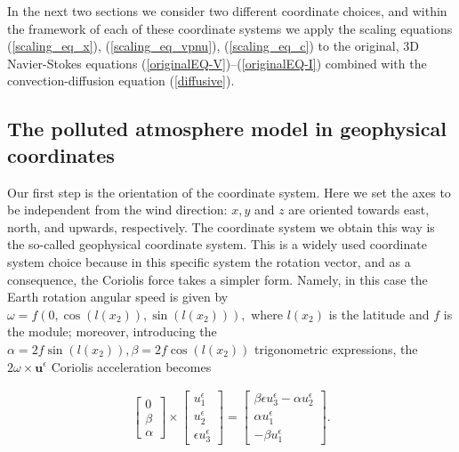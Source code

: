 \documentclass[12pt]{report}
\numberwithin{theorem}{chapter}
\numberwithin{corollary}{chapter}
\numberwithin{lemma}{chapter}
\numberwithin{remark}{chapter}
\numberwithin{definition}{chapter}
\numberwithin{prop}{chapter}
\begin{document}
In the next two sections we consider two different coordinate choices, and within the framework of each of these coordinate systems we apply the scaling equations (\ref{scaling_eq_x}), (\ref{scaling_eq_vpnu}), (\ref{scaling_eq_c}) to the original, 3D Navier-Stokes equations (\ref{originalEQ-V})--(\ref{originalEQ-I}) combined with the convection-diffusion equation (\ref{diffusive}).

\subsection{The polluted atmosphere model in geophysical coordinates} \label{eqsdescribingatmpluspollution_gfc}

Our first step is the orientation of the coordinate system. Here we set the axes to be independent from the wind direction: $x, y$ and $z$ are oriented towards east, north, and upwards, respectively. The coordinate system we obtain this way is the so-called geophysical coordinate system. This is a widely used coordinate system choice because in this specific system the rotation vector, and as a consequence, the Coriolis force takes a simpler form. Namely, in this case the Earth rotation angular speed is given by $\omega = f (0, \cos(l(x_2)), \sin(l(x_2))),$ where $l(x_2)$ is the latitude and $f$ is the module; moreover, introducing the $\alpha = 2f \sin(l(x_2)), \beta = 2f \cos(l(x_2))$ trigonometric expressions, the $2 \omega \times \mathbf{u}^\epsilon$ Coriolis acceleration becomes

\begin{gather}
\begin{bmatrix} 0 \\ \beta \\ \alpha \end{bmatrix}
 \times
 \begin{bmatrix} u^\epsilon_1 \\ u^\epsilon_2 \\ \epsilon u^\epsilon_3 \end{bmatrix}
 =
 \begin{bmatrix}  \beta \epsilon u^\epsilon_3 - \alpha u^\epsilon_2 \\ \alpha u^\epsilon_1  \\ - \beta u^\epsilon_1 \end{bmatrix}.
\end{gather}
    
\end{document}
